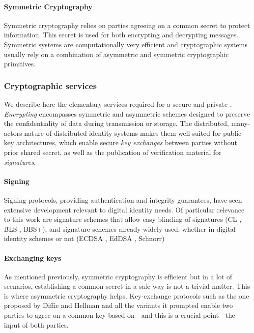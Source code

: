 \paragraph{Symmetric Cryptography} Symmetric cryptography relies on parties agreeing on a common secret to protect information. This secret is used for both encrypting and decrypting messages. Symmetric systems are computationally very efficient and cryptographic systems usually rely on a combination of asymmetric and symmetric cryptographic primitives.

\subsubsection{Cryptographic services} 
\label{pa:cryptographic-services}
We describe here the elementary services required for a secure and private \eid. \emph{Encrypting} encompasses symmetric and asymmetric schemes designed to preserve the confidentiality of data during transmission or storage. The distributed, many-actors nature of distributed identity systems makes them well-suited for public-key architectures, which enable secure \emph{key exchanges} between parties without prior shared secret, as well as the publication of verification material for \emph{signatures}.

\paragraph{Signing} 
\label{sp:signing}
Signing protocols, providing authentication and integrity guarantees, have seen extensive development relevant to digital identity needs. Of particular relevance to this work are signature schemes that allow easy blinding of signatures (CL \cite{CL02}, BLS \cite{BLS01}, BBS+\cite{ASM06}), and signature schemes already widely used, whether in digital identity schemes or not (ECDSA \cite{NIST186-5}, EdDSA \cite{BDLSY11}, Schnorr)

\paragraph{Exchanging keys}
\label{sp:exchanging-keys}
As mentioned previously, symmetric cryptography is efficient but in a lot of scenarios, establishing a common secret in a safe way is not a trivial matter. This is where asymmetric cryptography helps. Key-exchange protocols such as the one proposed by Diffie and Hellman \cite{DH76} and all the variants it prompted enable two parties to agree on a common key based on---and this is a crucial point---the input of both parties.

